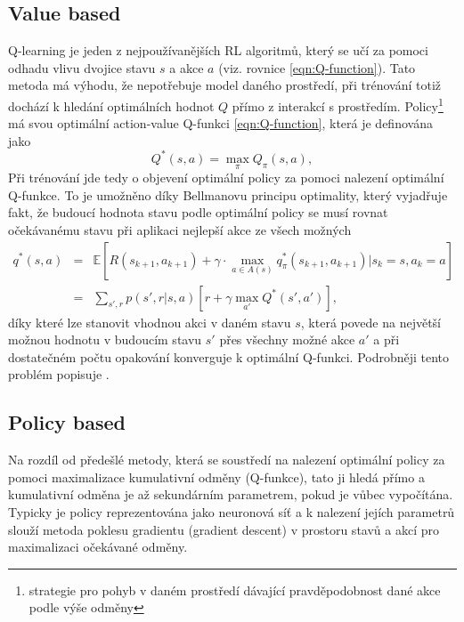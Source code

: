 \documentclass[czech, bc, kky, he, iso690numb]{fasthesis}
\begin{document}
            \subsection{Value based}
	            Q-learning je jeden z nejpoužívanějších RL algoritmů, který se učí za pomoci odhadu vlivu dvojice stavu \(s\) a akce \(a\) (viz. rovnice \ref{eqn:Q-function}). Tato metoda má výhodu, že nepotřebuje model daného prostředí, při trénování totiž dochází k hledání optimálních hodnot \(Q\) přímo z interakcí s prostředím. Policy\footnote{strategie pro pohyb v daném prostředí dávající pravděpodobnost dané akce podle výše odměny} má svou optimální action-value Q-funkci \ref{eqn:Q-function}, která je definována jako
	                \begin{equation}
	                    Q^{*}(s,a)= \max_{\pi}Q_{\pi}(s,a),
	                \end{equation}
	            Při trénování jde tedy o objevení optimální policy za pomoci nalezení optimální Q-funkce. To je umožněno díky Bellmanovu principu optimality, který vyjadřuje fakt, že budoucí hodnota stavu podle optimální policy se musí rovnat očekávanému stavu při aplikaci nejlepší akce ze všech možných
	                \begin{eqnarray}
	                	q^{*}(s,a)&=&\mathbb{E}[R(s_{k+1},a_{k+1}) + \gamma\cdot\max_{a \in A(s)}q_{\pi}^{*}(s_{k+1},a_{k+1}) | s_{k} = s, a_{k} = a]\\
	                	&=& \sum_{s', r}p(s', r|s, a)\left[r+\gamma\max_{a'}Q^{*}(s',a')\right],
	                \end{eqnarray}      
	            díky které lze stanovit vhodnou akci v daném stavu \(s\), která povede na největší možnou hodnotu v budoucím stavu \(s'\) přes všechny možné akce \(a'\) a při dostatečném počtu opakování konverguje k optimální Q-funkci. Podrobněji tento problém popisuje \cite[p.~63]{RLbook}.  
            \subsection{Policy based}
	            Na rozdíl od předešlé metody, která se soustředí na nalezení optimální policy za pomoci maximalizace kumulativní odměny (Q-funkce), tato ji hledá přímo a kumulativní odměna je až sekundárním parametrem, pokud je vůbec vypočítána. Typicky je policy reprezentována jako neuronová síť a k nalezení jejích parametrů slouží metoda poklesu gradientu (gradient descent) v prostoru stavů a akcí pro maximalizaci očekávané odměny.
	            
\end{document}
